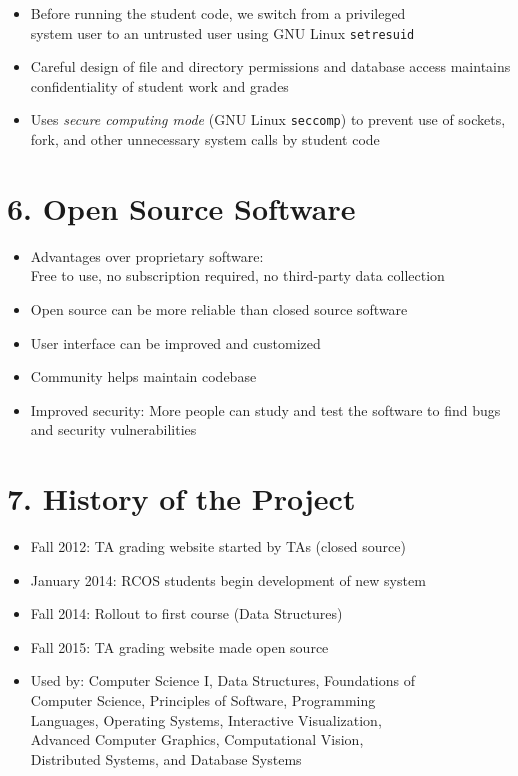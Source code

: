 \documentclass[thesis]{hmcposter}
\begin{document}
\begin{poster}
\begin{itemize}
        \item Before running the student code, we switch from a privileged \\ system user to an untrusted user using GNU Linux {\tt setresuid}
        \item Careful design of file and directory permissions and database access maintains confidentiality of student work and grades
        \item Uses {\em secure computing mode} (GNU Linux {\tt seccomp}) to prevent use of sockets, fork, and other unnecessary system calls by student code
    \end{itemize}
    
\columnbreak

\section{6. Open Source Software}
    \begin{itemize}
        \item Advantages over proprietary software: \\
Free to use, no subscription required, no third-party data collection
        \item Open source can be more reliable than closed source software
        \item User interface can be improved and customized
        \item Community helps maintain codebase
        \item Improved security:  More people can study and test the software to find bugs and security vulnerabilities
    \end{itemize}

\section{7. History of the Project}%
\begin{itemize}
    \item Fall 2012: TA grading website started by TAs (closed source)
    \item January 2014: RCOS students begin development of new system
    \item Fall 2014: Rollout to first course (Data Structures)
    \item Fall 2015: TA grading website made open source 
    \item Used by: Computer Science I, Data Structures, Foundations of \\
          Computer Science, Principles of Software, Programming \\ 
          Languages, Operating Systems, Interactive Visualization, \\
          Advanced Computer Graphics, Computational Vision, \\
          Distributed Systems, and Database Systems
\end{itemize}


\end{poster}
\end{document}
